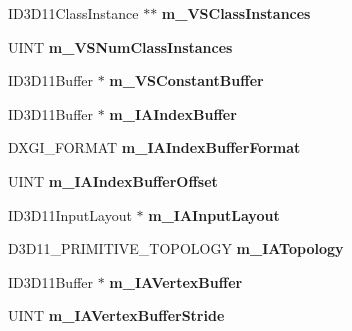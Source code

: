 \begin{DoxyCompactItemize}
\item 
\hypertarget{struct_c_state11_a96de622c737d2ea74d3a2551b1d4dbc2}{I\+D3\+D11\+Class\+Instance $\ast$$\ast$ {\bfseries m\+\_\+\+V\+S\+Class\+Instances}}\label{struct_c_state11_a96de622c737d2ea74d3a2551b1d4dbc2}

\item 
\hypertarget{struct_c_state11_a4b5e14464aa107a342b27f5f50dc3cda}{U\+I\+N\+T {\bfseries m\+\_\+\+V\+S\+Num\+Class\+Instances}}\label{struct_c_state11_a4b5e14464aa107a342b27f5f50dc3cda}

\item 
\hypertarget{struct_c_state11_ad5e96187f920bfa885baf6797638aff9}{I\+D3\+D11\+Buffer $\ast$ {\bfseries m\+\_\+\+V\+S\+Constant\+Buffer}}\label{struct_c_state11_ad5e96187f920bfa885baf6797638aff9}

\item 
\hypertarget{struct_c_state11_acf54cd09faf913d6af7f7dbe4774fb34}{I\+D3\+D11\+Buffer $\ast$ {\bfseries m\+\_\+\+I\+A\+Index\+Buffer}}\label{struct_c_state11_acf54cd09faf913d6af7f7dbe4774fb34}

\item 
\hypertarget{struct_c_state11_a77674c86221b120ed684fceed3f67223}{D\+X\+G\+I\+\_\+\+F\+O\+R\+M\+A\+T {\bfseries m\+\_\+\+I\+A\+Index\+Buffer\+Format}}\label{struct_c_state11_a77674c86221b120ed684fceed3f67223}

\item 
\hypertarget{struct_c_state11_aa6c185b32d9a0f5656389069caa81b61}{U\+I\+N\+T {\bfseries m\+\_\+\+I\+A\+Index\+Buffer\+Offset}}\label{struct_c_state11_aa6c185b32d9a0f5656389069caa81b61}

\item 
\hypertarget{struct_c_state11_a62837906054aa95e50679ef670de343a}{I\+D3\+D11\+Input\+Layout $\ast$ {\bfseries m\+\_\+\+I\+A\+Input\+Layout}}\label{struct_c_state11_a62837906054aa95e50679ef670de343a}

\item 
\hypertarget{struct_c_state11_ad5b8294e7adad57f6a1e956539014c90}{D3\+D11\+\_\+\+P\+R\+I\+M\+I\+T\+I\+V\+E\+\_\+\+T\+O\+P\+O\+L\+O\+G\+Y {\bfseries m\+\_\+\+I\+A\+Topology}}\label{struct_c_state11_ad5b8294e7adad57f6a1e956539014c90}

\item 
\hypertarget{struct_c_state11_a83ef99112d0d9d3e83ca2690d3100b8d}{I\+D3\+D11\+Buffer $\ast$ {\bfseries m\+\_\+\+I\+A\+Vertex\+Buffer}}\label{struct_c_state11_a83ef99112d0d9d3e83ca2690d3100b8d}

\item 
\hypertarget{struct_c_state11_a6ae7e07aaf888b5a556b93fb41b76d52}{U\+I\+N\+T {\bfseries m\+\_\+\+I\+A\+Vertex\+Buffer\+Stride}}\label{struct_c_state11_a6ae7e07aaf888b5a556b93fb41b76d52}


\end{DoxyCompactItemize}
